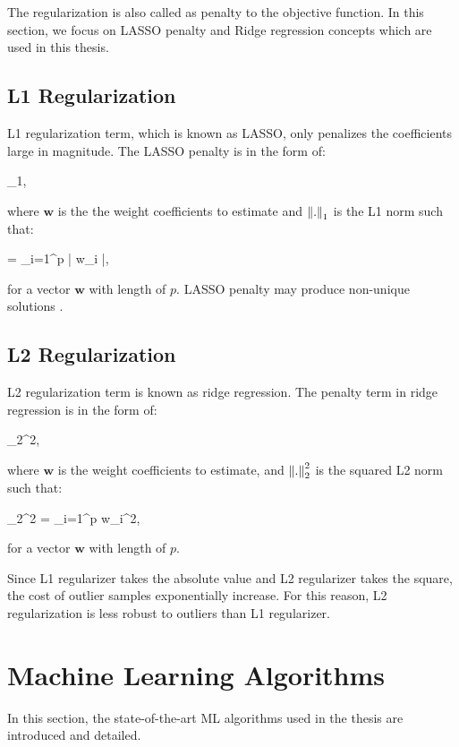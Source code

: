 The regularization is also called as penalty to the objective function. In this section, we focus on LASSO penalty and Ridge regression concepts which are used in this thesis.

\subsection{L1 Regularization}

L1 regularization term, which is known as LASSO, only penalizes the coefficients large in magnitude. The LASSO penalty is in the form of:

\be
\label{eq:lasso_term}
\lambda {}_{1},
\ee

where $\textbf{w}$ is the the weight coefficients to estimate and $\left\lVert.\right\rVert_{1}$ is the L1 norm such that:

\be
\label{eq:l1_norm}
 = \sum_{i=1}^{p} | w_{i} |,
\ee

for a vector $\textbf{w}$ with length of $p$. LASSO penalty may produce non-unique solutions \cite{lasso_penalty}.

\subsection{L2 Regularization}

L2 regularization term is known as ridge regression. The penalty term in ridge regression is in the form of:

\be
\label{eq:ridge_term}
\lambda {}_{2}^{2},
\ee

where $\textbf{w}$ is the weight coefficients to estimate, and $\left\lVert.\right\rVert_{2}^{2}$ is the squared L2 norm such that:

\be
\label{eq:l2_norm}
_{2}^{2} = \sum_{i=1}^{p} w_{i}^2,
\ee

for a vector $\textbf{w}$ with length of $p$. 

Since L1 regularizer takes the absolute value and L2 regularizer takes the square, the cost of outlier samples exponentially increase. For this reason, L2 regularization is less robust to outliers than L1 regularizer.

\section{Machine Learning Algorithms}

In this section, the state-of-the-art ML algorithms used in the thesis are introduced and detailed. 
